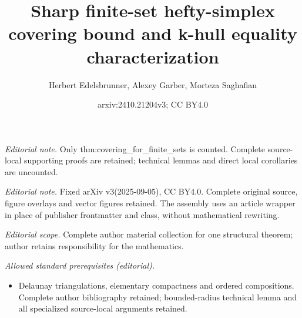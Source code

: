 \documentclass[10pt,a4paper]{article}
\title{Sharp finite-set hefty-simplex covering bound and k-hull equality characterization}
\author{Herbert Edelsbrunner, Alexey Garber, Morteza Saghafian}
\date{arxiv:2410.21204v3; CC BY4.0}
\theoremstyle{plain}
\begin{document}
\maketitle
\noindent\textit{Editorial note.} Only thm:covering\_for\_finite\_sets is counted. Complete source-local supporting proofs are retained; technical lemmas and direct local corollaries are uncounted.\par\medskip
\noindent\textit{Editorial note.} Fixed arXiv v3(2025-09-05), CC BY4.0. Complete original source, figure overlays and vector figures retained. The assembly uses an article wrapper in place of publisher frontmatter and class, without mathematical rewriting.\par\medskip
\noindent\textit{Editorial scope.} Complete author material collection for one structural theorem; author retains responsibility for the mathematics.\par\medskip
\noindent\textit{Allowed standard prerequisites (editorial).}\begin{itemize}
\item Delaunay triangulations, elementary compactness and ordered compositions. Complete author bibliography retained; bounded-radius technical lemma and all specialized source-local arguments retained.
\end{itemize}\medskip
\end{document}
